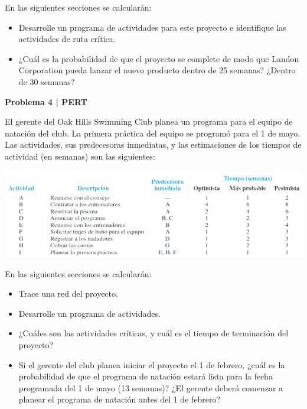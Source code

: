 \documentclass{article}
\begin{document}
\begin{problem}
En las siguientes secciones se calcularán:

\begin{itemize}
  \item Desarrolle un programa de actividades para este proyecto e identifique las actividades de ruta crítica.
\item ¿Cuál es la probabilidad de que el proyecto se complete de modo que Landon Corporation pueda lanzar el nuevo producto dentro de 25 semanas? ¿Dentro de 30 semanas?
\end{itemize}
\end{problem}

\newpage
\begin{problem}
\textbf{Problema 4 | PERT}

El gerente del Oak Hills Swimming Club planea un programa para el equipo de natación del club. La primera práctica del equipo se programó para el 1 de mayo. Las actividades, sus predecesoras inmediatas, y las estimaciones de los tiempos de actividad (en semanas) son las siguientes: 

\begin{center}
\includegraphics[width=\linewidth]{images/10-problema4.png}
\end{center}

En las siguientes secciones se calcularán:

\begin{itemize}
    \item Trace una red del proyecto.
    \item Desarrolle un programa de actividades.
    \item ¿Cuáles son las actividades críticas, y cuál es el tiempo de terminación del proyecto?
    \item Si el gerente del club planea iniciar el proyecto el 1 de febrero, ¿cuál es la probabilidad de que el programa de natación estará lista para la fecha programada del 1 de mayo (13 semanas)? ¿El gerente deberá comenzar a planear el programa de natación antes del 1 de febrero? 
\end{itemize}
\end{problem}
\end{document}
